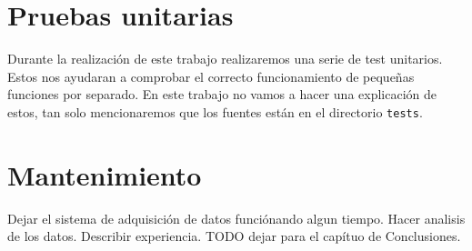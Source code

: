 \section{Pruebas unitarias}
	Durante la realización de este trabajo realizaremos una serie de test unitarios\cite{UnitTest}. Estos nos ayudaran a comprobar el correcto
	funcionamiento de pequeñas funciones por separado. En este trabajo no vamos a hacer una explicación de estos, tan solo mencionaremos que los
	fuentes están en el directorio \texttt{tests}.

\section{Mantenimiento}
	Dejar el sistema de adquisición de datos funciónando algun tiempo. Hacer analisis de los datos. Describir experiencia.  TODO dejar para el capítuo de Conclusiones.
